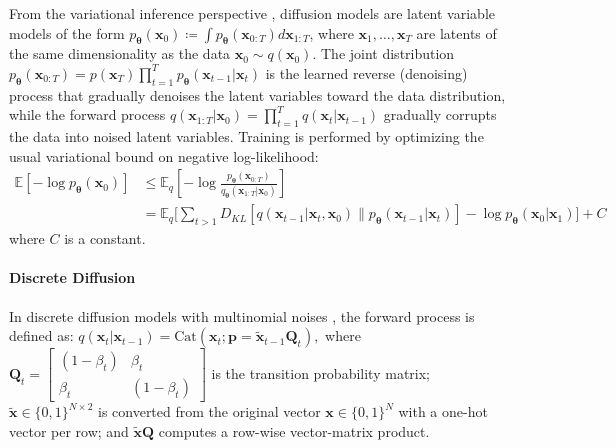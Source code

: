 \documentclass{article}
\theoremstyle{plain}
\theoremstyle{definition}
\theoremstyle{remark}
\begin{document}
From the variational inference perspective \citep{kingma2021variational}, diffusion models \citep{sohl2015deep,ho2020denoising,song2019generative} are latent variable models of the form
$p_{\boldsymbol{\theta}}(\mathbf{x}_0) \coloneqq \int p_{\boldsymbol{\theta}}(\mathbf{x}_{0:T}) d \mathbf{x}_{1:T}$, where $\mathbf{x}_1,\dots,\mathbf{x}_T$ are latents of the same dimensionality as the data %
$\mathbf{x}_0 \sim q(\mathbf{x}_0)$.
The joint distribution
$
    p_{\boldsymbol{\theta}}(\mathbf{x}_{0:T}) =
    p(\mathbf{x}_{T})
    \prod_{t=1}^T p_{\boldsymbol{\theta}}(\mathbf{x}_{t-1} | \mathbf{x}_{t})
$
is the learned reverse (denoising) process that gradually denoises the latent variables toward the data distribution, while the forward process
$
    q(\mathbf{x}_{1:T} | \mathbf{x}_0) =
    \prod_{t=1}^T q(\mathbf{x}_{t} | \mathbf{x}_{t-1})
$
gradually corrupts the data into noised latent variables. Training is performed by optimizing the usual variational bound on negative log-likelihood:
\begin{equation}\label{eq:training}
\begin{split}
     \mathbb{E}\left[- \log p_{\boldsymbol{\theta}}(\mathbf{x}_0)\right] & \le 
    \mathbb{E}_q \left[  - \log \frac{p_{\boldsymbol{\theta}}(\mathbf{x}_{0:T})}{q_{\boldsymbol{\theta}}(\mathbf{x}_{1:T} | \mathbf{x}_0)}\right] \\
    & = \mathbb{E}_q  \biggl[
        \sum_{t>1} D_{KL}[ q(\mathbf{x}_{t-1}|\mathbf{x}_t, \mathbf{x}_0) \| p_{\boldsymbol{\theta}}(\mathbf{x}_{t-1}|\mathbf{x}_t)]
        - \log p_{\boldsymbol{\theta}} (\mathbf{x}_0 | \mathbf{x}_1)
    \biggr] + C
\end{split}
\end{equation}
where $C$ is a constant.
\paragraph{Discrete Diffusion}
In discrete diffusion models with multinomial noises \citep{austin2021structured,hoogeboom2021argmax}, the forward process is defined as:
$
    q(\mathbf{x}_{t} | \mathbf{x}_{t-1}) =
    \mathrm{Cat}\left(\mathbf{x}_t ; \mathbf{p} = \tilde{\mathbf{x}}_{t-1} \mathbf{Q}_t\right),
$
where $\mathbf{Q}_t = 
\begin{bmatrix}
(1 - \beta_t) & \beta_t \\
\beta_t & (1 - \beta_t)
\end{bmatrix}
$ is the transition probability matrix;
$\tilde{\mathbf{x}} \in \{0, 1\}^{N \times 2}$ is converted from the original vector $\mathbf{x} \in \{0, 1\}^{N}$ with a one-hot vector per row; and $\tilde{\mathbf{x}}\mathbf{Q}$ computes a row-wise vector-matrix product.
\end{document}
